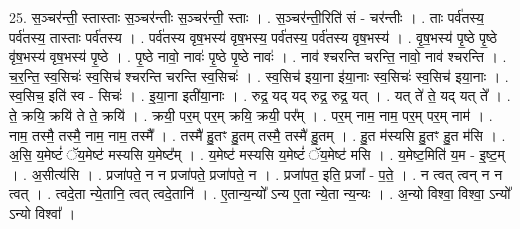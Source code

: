 \documentclass[17pt]{extarticle}
\begin{document}
25. स॒ञ्चर॑न्ती॒ स्तास्ताः स॒ञ्चर॑न्तीः स॒ञ्चर॑न्ती॒ स्ताः । . स॒ञ्चर॑न्ती॒रिति॑ सं - चर॑न्तीः । . ताः पर्व॑तस्य॒ पर्व॑तस्य॒ तास्ताः पर्व॑तस्य । . पर्व॑तस्य वृष॒भस्य॑ वृष॒भस्य॒ पर्व॑तस्य॒ पर्व॑तस्य वृष॒भस्य॑ । . वृ॒ष॒भस्य॑ पृ॒ष्ठे पृ॒ष्ठे वृ॑ष॒भस्य॑ वृष॒भस्य॑ पृ॒ष्ठे । . पृ॒ष्ठे नावो॒ नावः॑ पृ॒ष्ठे पृ॒ष्ठे नावः॑ । . नाव॑ श्चरन्ति चरन्ति॒ नावो॒ नाव॑ श्चरन्ति । . च॒र॒न्ति॒ स्व॒सिचः॑ स्व॒सिच॑ श्चरन्ति चरन्ति स्व॒सिचः॑ । . स्व॒सिच॑ इया॒ना इ॑या॒नाः स्व॒सिचः॑ स्व॒सिच॑ इया॒नाः । . स्व॒सिच॒ इति॑ स्व - सिचः॑ । . इ॒या॒ना इती॑या॒नाः । . रुद्र॒ यद् यद् रुद्र॒ रुद्र॒ यत् । . यत् ते॑ ते॒ यद् यत् ते᳚ । . ते॒ क्रयि॒ क्रयि॑ ते ते॒ क्रयि॑ । . क्रयी॒ पर॒म् पर॒म् क्रयि॒ क्रयी॒ पर᳚म् । . पर॒म् नाम॒ नाम॒ पर॒म् पर॒म् नाम॑ । . नाम॒ तस्मै॒ तस्मै॒ नाम॒ नाम॒ तस्मै᳚ । . तस्मै॑ हु॒तꣳ हु॒तम् तस्मै॒ तस्मै॑ हु॒तम् । . हु॒त म॑स्यसि हु॒तꣳ हु॒त म॑सि । . अ॒सि॒ य॒मेष्टं॑ ॅय॒मेष्ट॑ मस्यसि य॒मेष्ट᳚म् । . य॒मेष्ट॑ मस्यसि य॒मेष्टं॑ ॅय॒मेष्ट॑ मसि । . य॒मेष्ट॒मिति॑ य॒म - इ॒ष्ट॒म् । . अ॒सीत्य॑सि । . प्रजा॑पते॒ न न प्रजा॑पते॒ प्रजा॑पते॒ न । . प्रजा॑पत॒ इति॒ प्रजा᳚ - प॒ते॒ । . न त्वत् त्वन् न न त्वत् । . त्वदे॒ता न्ये॒तानि॒ त्वत् त्वदे॒तानि॑ । . ए॒तान्य॒न्यो᳚ ऽन्य ए॒ता न्ये॒ता न्य॒न्यः । . अ॒न्यो विश्वा॒ विश्वा॒ ऽन्यो᳚ ऽन्यो विश्वा᳚ । \newline
\end{document}
